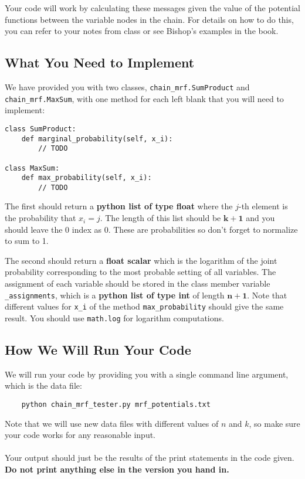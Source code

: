 \documentclass[11pt]{article}
\newcommand{\code}[1]{{\footnotesize \tt #1}}
\begin{document}
Your code will work by calculating these messages given the value of the potential functions between the variable nodes in the chain. For details on how to do this, you can refer to your notes from class or see Bishop's examples in the book.


\subsection{What You Need to Implement} %
We have provided you with two classes, \code{chain\_mrf.SumProduct} and \code{chain\_mrf.MaxSum}, with one method for each left blank that you will need to implement:
\begin{verbatim}
class SumProduct:
    def marginal_probability(self, x_i):
        // TODO

class MaxSum:
    def max_probability(self, x_i):
        // TODO
\end{verbatim}
 The first should return a \textbf{python list of type float} where the $j$-th element is the probability that $x_i = j$. The length of this list should be $\mathbf{k+1}$ and you should leave the 0 index as 0. These are probabilities so don't forget to normalize to sum to 1.

 The second should return a \textbf{float scalar} which is the logarithm of the joint probability corresponding to the most probable setting of all variables. The assignment of each variable should be stored in the class member variable \code{\_assignments}, which is a \textbf{python list of type int} of length $\mathbf{n+1}$. Note that different values for \code{x\_i} of the method \code{max\_probability} should give the same result. You should use \code{math.log} for logarithm computations.


\subsection{How We Will Run Your Code} %
We will run your code by providing you with a single command line argument, which is the data file:
\begin{verbatim}
    python chain_mrf_tester.py mrf_potentials.txt
\end{verbatim}
Note that we will use new data files with different values of $n$ and $k$, so make sure your code works for any reasonable input.\\
\\
Your output should just be the results of the print statements in the code given. {\bf Do not print anything else in the version you hand in.}
	
\end{document}
